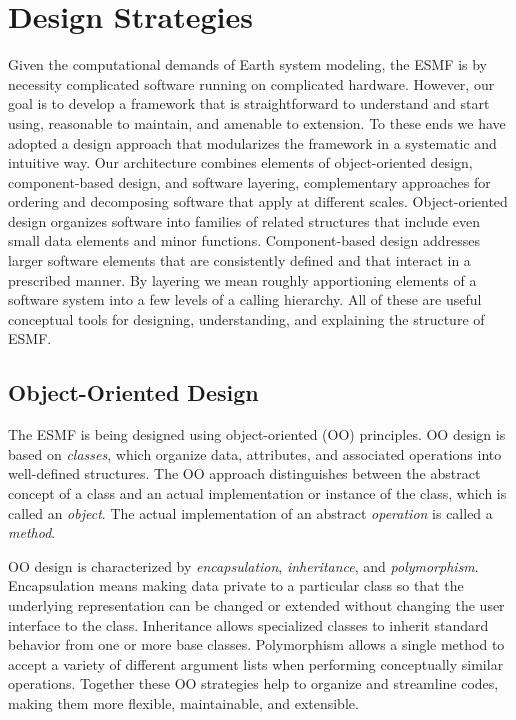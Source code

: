 \section{Design Strategies}
\label{sec:strategies}

Given the computational demands of Earth system modeling, the ESMF is by 
necessity complicated software running on complicated hardware.  However,
our goal is to develop a framework that is straightforward to understand and 
start using, reasonable to maintain, and amenable to extension.  To these 
ends we have adopted a design approach that modularizes the framework in a 
systematic and intuitive way.  Our architecture combines elements of 
object-oriented design, component-based design, and software layering, 
complementary approaches for ordering and decomposing software that apply
at different scales.  Object-oriented design organizes software into families 
of related structures that include even 
small data elements and minor functions.  Component-based design addresses 
larger software elements that are consistently defined and that interact
in a prescribed manner.  By layering we mean roughly apportioning elements 
of a software system into a few levels of a calling hierarchy.
All of these are useful conceptual tools for designing, understanding, and
explaining the structure of ESMF.

\subsection{Object-Oriented Design}

The ESMF is being designed using object-oriented (OO) principles.  OO design
is based on {\it classes}, which organize data, attributes, and associated 
operations into well-defined structures.  The OO approach distinguishes between 
the abstract concept of a class and an actual implementation or instance of the 
class, which is called an {\it object}.  The actual implementation of an 
abstract {\it operation} is called a {\it method}.

OO design is characterized by {\it encapsulation}, {\it inheritance}, and 
{\it polymorphism}.  Encapsulation means making data 
private to a particular class so that the underlying representation
can be changed or extended without changing the user interface to the class.
Inheritance allows specialized classes to inherit standard behavior from one
or more base
classes.  Polymorphism allows a single method to accept a variety of 
different argument lists when performing conceptually similar operations.  
Together these OO strategies help to organize and streamline codes, making 
them more flexible, maintainable, and extensible. 

